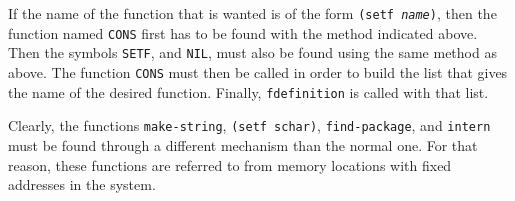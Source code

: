 If the name of the function that is wanted is of the form
\texttt{(setf \emph{name})}, then the function named \texttt{CONS}
first has to be found with the method indicated above.  Then the 
symbols \texttt{SETF}, and \texttt{NIL}, must also be found using the
same method as above.  The function \texttt{CONS} must then be called
in order to build the list that gives the name of the desired
function.  Finally, \texttt{fdefinition} is called with that list. 

Clearly, the functions \texttt{make-string}, \texttt{(setf schar)},
\texttt{find-package}, and \texttt{intern} must be found through a
different mechanism than the normal one.  For that reason, these
functions are referred to from memory locations with fixed addresses
in the system.  
